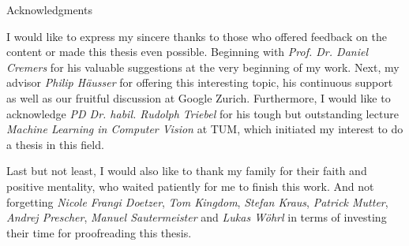 \thispagestyle{empty}

\vspace*{20mm}

\begin{center}
{ Acknowledgments}
\end{center}

\vspace{10mm}

I would like to express my sincere thanks to those who offered feedback on the content or made this thesis even possible. Beginning with \textit{Prof. Dr. Daniel Cremers} for his valuable suggestions at the very beginning of my work. Next, my advisor \textit{Philip Häusser} for offering this interesting topic, his continuous support as well as our fruitful discussion at Google Zurich. Furthermore, I would like to acknowledge \textit{PD Dr. habil. Rudolph Triebel} for his tough but outstanding lecture \textit{Machine Learning in Computer Vision} at TUM, which initiated my interest to do a thesis in this field.


Last but not least, I would also like to thank my family for their faith and positive mentality, who waited patiently for me to finish this work. And not forgetting \textit{Nicole Frangi Doetzer}, \textit{Tom Kingdom}, \textit{Stefan Kraus}, \textit{Patrick Mutter}, \textit{Andrej Prescher}, \textit{Manuel Sautermeister} and \textit{Lukas Wöhrl} in terms of investing their time for proofreading this thesis.

\cleardoublepage{}
